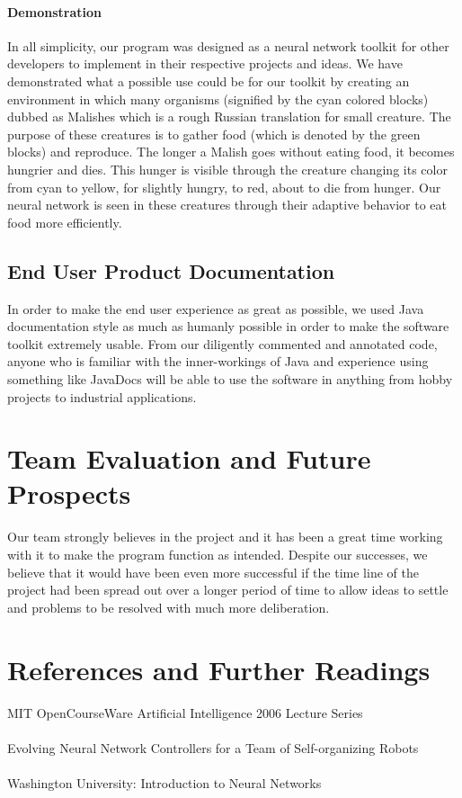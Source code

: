 \documentclass[]{article}
\begin{document}
		\paragraph{Demonstration} In all simplicity, our program was designed as a neural network toolkit for other developers to implement in their respective projects and ideas. We have demonstrated what a possible use could be for our toolkit by creating an environment in which many organisms (signified by the cyan colored blocks) dubbed as Malishes which is a rough Russian translation for small creature. The purpose of these creatures is to gather food (which is denoted by the green blocks) and reproduce. The longer a Malish goes without eating food, it becomes hungrier and dies. This hunger is visible through the creature changing its color from cyan to yellow, for slightly hungry, to red, about to die from hunger. Our neural network is seen in these creatures through their adaptive behavior to eat food more efficiently.  
	\subsection{End User Product Documentation}
		In order to make the end user experience as great as possible, we used Java documentation style as much as humanly possible in order to make the software toolkit extremely usable. From our diligently commented and annotated code, anyone who is familiar with the inner-workings of Java and experience using something like JavaDocs will be able to use the software in anything from hobby projects to industrial applications.
\section{Team Evaluation and Future Prospects}
	Our team strongly believes in the project and it has been a great time working with it to make the program function as intended. Despite our successes, we believe that it would have been even more successful if the time line of the project had been spread out over a longer period of time to allow ideas to settle and problems to be resolved with much more deliberation.
\cleardoublepage
\section{References and Further Readings}
	MIT OpenCourseWare Artificial Intelligence 2006 Lecture Series \\ \\
	Evolving Neural Network Controllers for a Team of
	Self-organizing Robots\\\\
	Washington University: Introduction to Neural Networks
\end{document}
